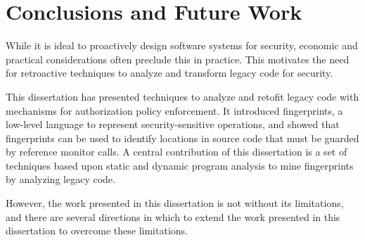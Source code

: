 \chapter{Conclusions and Future Work}
\label{chapter:conclusions}

While it is ideal to proactively design software systems for security, economic
and practical considerations often preclude this in practice. This motivates the
need for retroactive techniques to analyze and transform legacy code for
security.

This dissertation has presented techniques to analyze and retofit legacy code
with mechanisms for authorization policy enforcement. It introduced
fingerprints, a low-level language to represent security-sensitive operations,
and showed that fingerprints can be used to identify locations in source code
that must be guarded by reference monitor calls. A central contribution of this
dissertation is a set of techniques based upon static and dynamic program
analysis to mine fingerprints by analyzing legacy code.

However, the work presented in this dissertation is not without its
limitations, and there are several directions in which to extend the work
presented in this dissertation to overcome these limitations.

